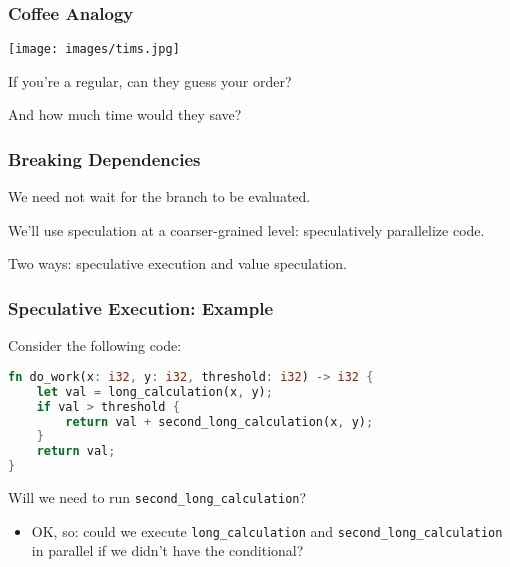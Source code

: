 \begin{frame}
\frametitle{Coffee Analogy}

\begin{center}
	\texttt{[image: images/tims.jpg]}
\end{center}

If you're a regular, can they guess your order?

And how much time would they save?

\end{frame}

  

\begin{frame}
\frametitle{Breaking Dependencies}

We need not wait for the branch to be evaluated.

We'll use speculation at a coarser-grained level: speculatively parallelize code.

Two ways: \alert{speculative execution} and
      \alert{value speculation}.
  
\end{frame}




\begin{frame}[fragile]
  \frametitle{Speculative Execution: Example}

  
Consider the following code:
  
\begin{lstlisting}[language=Rust]
fn do_work(x: i32, y: i32, threshold: i32) -> i32 {
    let val = long_calculation(x, y);
    if val > threshold {
        return val + second_long_calculation(x, y);
    }
    return val;
}
\end{lstlisting}

  Will we need to run {\tt second\_long\_calculation}?
  \vfill  
  \begin{itemize}
    \item<2> OK, so: could we execute {\tt long\_calculation} and {\tt second\_long\_calculation}
      in parallel if we didn't have the conditional?
  \end{itemize}
  
\end{frame}

